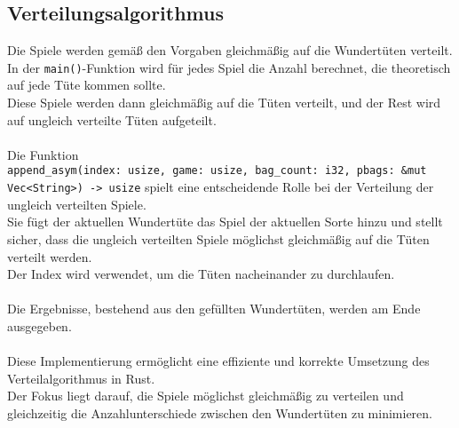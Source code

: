 \subsection{Verteilungsalgorithmus}
Die Spiele werden gemäß den Vorgaben gleichmäßig auf die Wundertüten verteilt. \\
In der \texttt{main()}-Funktion wird für jedes Spiel die Anzahl berechnet, die theoretisch auf jede Tüte kommen sollte. \\
Diese Spiele werden dann gleichmäßig auf die Tüten verteilt, und der Rest wird auf ungleich verteilte Tüten aufgeteilt.\\
\\
Die Funktion \\
\texttt{append\_asym(index: usize, game: usize, bag\_count: i32, pbags: \&mut Vec<String>) -> usize} 
spielt eine entscheidende Rolle bei der Verteilung der ungleich verteilten Spiele. \\
Sie fügt der aktuellen Wundertüte das Spiel der aktuellen Sorte hinzu und stellt sicher, 
dass die ungleich verteilten Spiele möglichst gleichmäßig auf die Tüten verteilt werden. \\
Der Index wird verwendet, um die Tüten nacheinander zu durchlaufen. \\
\\
Die Ergebnisse, bestehend aus den gefüllten Wundertüten, werden am Ende ausgegeben.
\\
\\
Diese Implementierung ermöglicht eine effiziente und korrekte Umsetzung des Verteilalgorithmus in Rust. \\
Der Fokus liegt darauf, die Spiele möglichst gleichmäßig zu verteilen und \\
gleichzeitig die Anzahlunterschiede zwischen den Wundertüten zu minimieren.